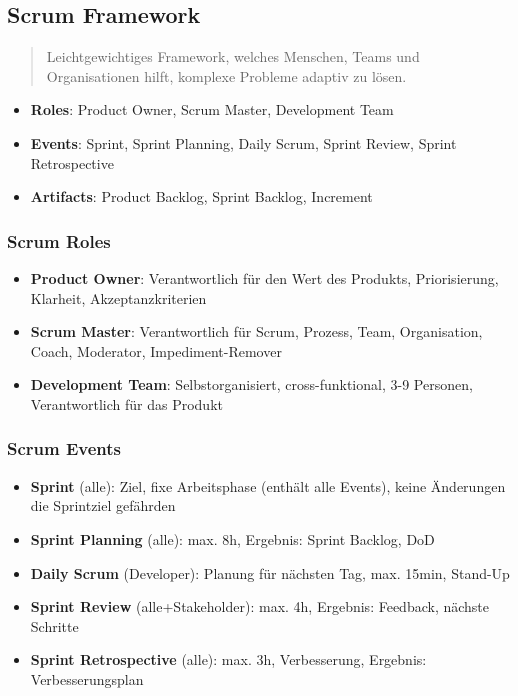 \documentclass{article}
\begin{document}
\subsection{Scrum Framework}
\begin{quote}Leichtgewichtiges Framework, welches Menschen, Teams und Organisationen hilft, komplexe Probleme adaptiv zu lösen.\end{quote}

\begin{itemize}
  \item \textbf{Roles}: Product Owner, Scrum Master, Development Team
  \item \textbf{Events}: Sprint, Sprint Planning, Daily Scrum, Sprint Review, Sprint Retrospective
  \item \textbf{Artifacts}: Product Backlog, Sprint Backlog, Increment
\end{itemize}

\subsubsection{Scrum Roles}
\begin{itemize}
  \item \textbf{Product Owner}: Verantwortlich für den Wert des Produkts, Priorisierung, Klarheit, Akzeptanzkriterien
  \item \textbf{Scrum Master}: Verantwortlich für Scrum, Prozess, Team, Organisation, Coach, Moderator, Impediment-Remover
  \item \textbf{Development Team}: Selbstorganisiert, cross-funktional, 3-9 Personen, Verantwortlich für das Produkt
\end{itemize}

\subsubsection{Scrum Events}
\begin{itemize}
  \item \textbf{Sprint} (alle): Ziel, fixe Arbeitsphase (enthält alle Events), keine Änderungen die Sprintziel gefährden
  \item \textbf{Sprint Planning} (alle): max. 8h, Ergebnis: Sprint Backlog, DoD
  \item \textbf{Daily Scrum} (Developer): Planung für nächsten Tag, max. 15min, Stand-Up
  \item \textbf{Sprint Review} (alle+Stakeholder): max. 4h, Ergebnis: Feedback, nächste Schritte
  \item \textbf{Sprint Retrospective} (alle): max. 3h, Verbesserung, Ergebnis: Verbesserungsplan
\end{itemize}
\end{document}
